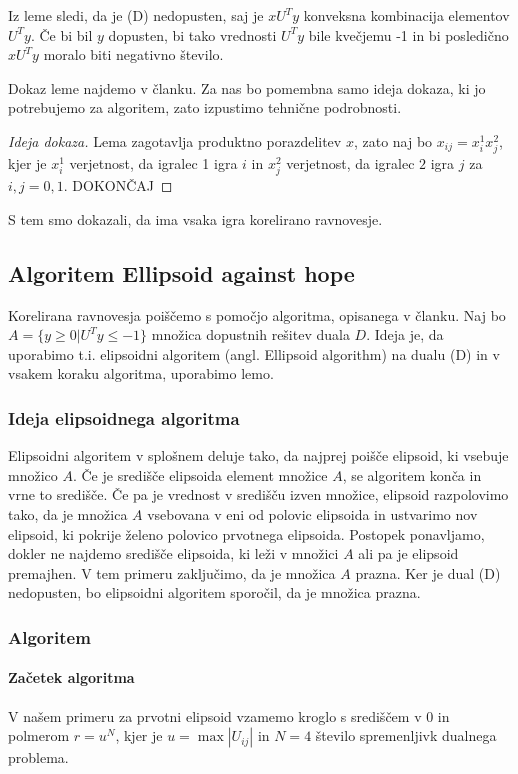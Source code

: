 \documentclass{article}
\begin{document}
Iz leme sledi, da je (D) nedopusten, saj je $x U^T y$ konveksna kombinacija elementov $U^T y$. Če bi bil $y$ dopusten, bi tako vrednosti $U^T y$ bile kvečjemu -1 in bi posledično $x U^T y$ moralo biti negativno število. 

Dokaz leme najdemo v članku. Za nas bo pomembna samo ideja dokaza, ki jo potrebujemo za algoritem, zato izpustimo tehnične podrobnosti.
\begin{proof}[Ideja dokaza]
    Lema zagotavlja produktno porazdelitev $x$, zato naj bo $x_{ij} = x_i^1 x_j^2$, kjer je $x_i^1$ verjetnost, da igralec 1 igra $i$ in $x_j^2$ verjetnost, da igralec $2$ igra $j$ za $i, j = 0, 1$. 
    DOKONČAJ
    \qedsymbol
\end{proof}
S tem smo dokazali, da ima vsaka igra korelirano ravnovesje.

\subsection[]{Algoritem Ellipsoid against hope}
Korelirana ravnovesja poiščemo s pomočjo algoritma, opisanega v članku. Naj bo $A = \{y \geq 0 | U^T y \leq -1\}$ množica dopustnih rešitev duala $D$. Ideja je, da uporabimo t.i. elipsoidni algoritem (angl. Ellipsoid algorithm) na dualu (D) in v vsakem koraku algoritma, uporabimo lemo.
 
\subsubsection[]{Ideja elipsoidnega algoritma}
Elipsoidni algoritem v splošnem deluje tako, da najprej poišče elipsoid, ki vsebuje množico $A$. Če je središče elipsoida element množice $A$, se algoritem konča in vrne to središče. Če pa je vrednost v središču izven množice, elipsoid razpolovimo tako, da je množica $A$ vsebovana v eni od polovic elipsoida in ustvarimo nov elipsoid, ki pokrije želeno polovico prvotnega elipsoida. Postopek ponavljamo, dokler ne najdemo središče elipsoida, ki leži v množici $A$ ali pa je elipsoid premajhen. V tem primeru zaključimo, da je množica $A$ prazna. Ker je dual (D) nedopusten, bo elipsoidni algoritem sporočil, da je množica prazna.

\subsubsection[]{Algoritem}
\paragraph*{Začetek algoritma}
V našem primeru za prvotni elipsoid vzamemo kroglo s središčem v 0 in polmerom $r = u^N$, kjer je $u = \max |U_{ij}|$ in $N = 4$ število spremenljivk dualnega problema.
\end{document}
